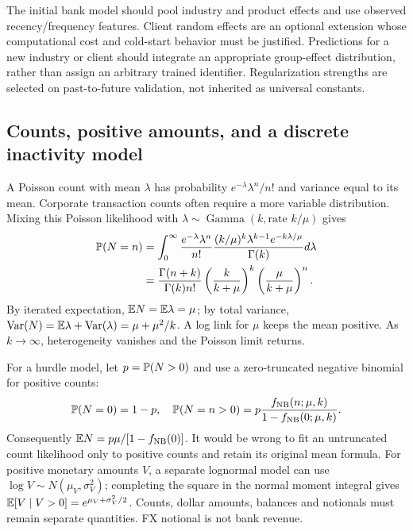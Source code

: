 The initial bank model should pool industry and product effects and use observed recency/frequency features. Client random effects are an optional extension whose computational cost and cold-start behavior must be justified. Predictions for a new industry or client should integrate an appropriate group-effect distribution, rather than assign an arbitrary trained identifier. Regularization strengths are selected on past-to-future validation, not inherited as universal constants.

\subsection{Counts, positive amounts, and a discrete inactivity model}

A Poisson count with mean $\lambda$ has probability $e^{-\lambda}\lambda^n/n!$ and variance equal to its mean. Corporate transaction counts often require a more variable distribution. Mixing this Poisson likelihood with $\lambda\sim\operatorname{Gamma}(k,\text{rate }k/\mu)$ gives
\begin{align}
 \mathbb{P}(N=n)
 &=\int_0^\infty\frac{e^{-\lambda}\lambda^n}{n!}
   \frac{(k/\mu)^k\lambda^{k-1}e^{-k\lambda/\mu}}{\Gamma(k)}d\lambda\nonumber\\
 &=\frac{\Gamma(n+k)}{\Gamma(k)n!}
       \left(\frac{k}{k+\mu}\right)^k
       \left(\frac{\mu}{k+\mu}\right)^n.
 \label{eq:nb}
\end{align}
By iterated expectation, $\mathbb{E} N=\mathbb{E}\lambda=\mu$; by total variance, $\operatorname{Var}(N)=\mathbb{E}\lambda+\operatorname{Var}(\lambda)=\mu+\mu^2/k$. A log link for $\mu$ keeps the mean positive. As $k\to\infty$, heterogeneity vanishes and the Poisson limit returns.

For a hurdle model, let $p=\mathbb{P}(N>0)$ and use a zero-truncated negative binomial for positive counts:
\[
 \mathbb{P}(N=0)=1-p,\quad
 \mathbb{P}(N=n>0)=p\frac{f_{\rm NB}(n;\mu,k)}{1-f_{\rm NB}(0;\mu,k)}.
\]
Consequently $\mathbb{E} N=p\mu/[1-f_{\rm NB}(0)]$. It would be wrong to fit an untruncated count likelihood only to positive counts and retain its original mean formula. For positive monetary amounts $V$, a separate lognormal model can use $\log V\sim N(\mu_V,\sigma_V^2)$; completing the square in the normal moment integral gives $\mathbb{E}[V\mid V>0]=e^{\mu_V+\sigma_V^2/2}$. Counts, dollar amounts, balances and notionals must remain separate quantities. FX notional is not bank revenue.

